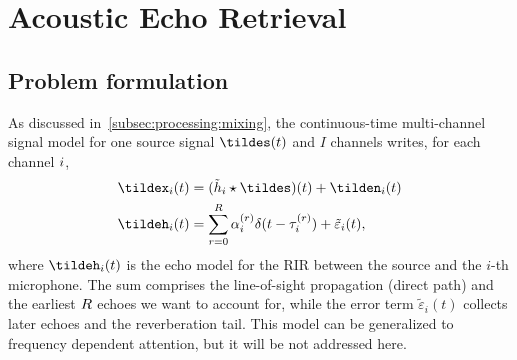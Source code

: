 \chapter{Acoustic Echo Retrieval}\label{ch:estimation}
\vspace{-2.5em}
\synopsisChEstimation

\section{Problem formulation}\label{sec:estimation:problem}
As discussed in~\cref{subsec:processing:mixing}, the continuous-time multi-channel signal model for one source signal $\tildes(t)$ and $I$ channels writes, for each channel $i$,
\begin{equation}\label{eq:estimation:signalmodel}
    \begin{aligned}
        \tildex_i(t) &= (\tilde{h}_i \convCont \tildes)(t) + \tilden_i(t)\\
        \tildeh_i(t) &= \echoModelTimeSimple{i} + \tilde{\varepsilon}_i(t),
    \end{aligned}
\end{equation}
where $\tildeh_i(t)$ is the echo model for the \ac{RIR} between the source and the $i$-th microphone.
The sum comprises the line-of-sight propagation (direct path) and the earliest $R$ echoes we want to account for, while the error term $\tilde{\varepsilon}_i(t)$ collects later echoes and the reverberation tail.
This model can be generalized to frequency dependent attention, but it will be not addressed here.

